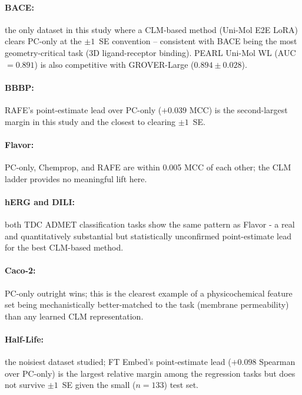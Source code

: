 \documentclass[9pt,a4paper]{article}
\begin{document}
\paragraph{BACE:} the only dataset in this study where a CLM-based method (Uni-Mol E2E LoRA) clears PC-only at the $\pm1$~SE convention -- consistent with BACE being the most geometry-critical task (3D ligand-receptor binding). PEARL Uni-Mol WL (AUC~$=0.891$) is also competitive with GROVER-Large ($0.894\pm0.028$).

\paragraph{BBBP:} RAFE's point-estimate lead over PC-only ($+0.039$ MCC) is the second-largest margin in this study and the closest to clearing $\pm1$~SE.

\paragraph{Flavor:} PC-only, Chemprop, and RAFE are within 0.005 MCC of each other; the CLM ladder provides no meaningful lift here.

\paragraph{hERG and DILI:} both TDC ADMET classification tasks show the same pattern as Flavor - a real and quantitatively substantial but statistically unconfirmed point-estimate lead for the best CLM-based method.

\paragraph{Caco-2:} PC-only outright wins; this is the clearest example of a physicochemical feature set being mechanistically better-matched to the task (membrane permeability) than any learned CLM representation.

\paragraph{Half-Life:} the noisiest dataset studied; FT Embed's point-estimate lead ($+0.098$ Spearman over PC-only) is the largest relative margin among the regression tasks but does not survive $\pm1$~SE given the small ($n=133$) test set.



\end{document}
